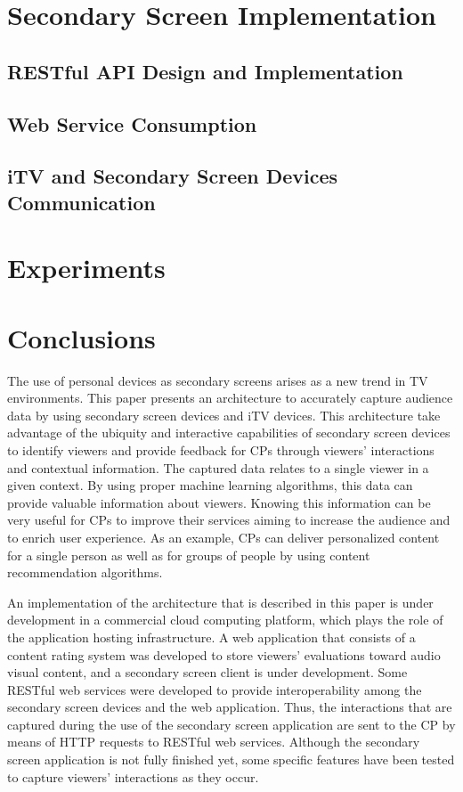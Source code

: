 \documentclass[journal]{IEEEtran}
\begin{document}
\section{Secondary Screen Implementation}

\subsection{RESTful API Design and Implementation}

\subsection{Web Service Consumption}

\subsection{iTV and Secondary Screen Devices Communication}

\section{Experiments}

\section{Conclusions}

The use of personal devices as secondary screens arises as a new trend in TV environments. This paper presents an architecture to accurately capture audience data by using secondary screen devices and iTV devices. This architecture take advantage of the ubiquity and interactive capabilities of secondary screen devices to identify viewers and provide feedback for CPs through viewers' interactions and contextual information. The captured data relates to a single viewer in a given context. By using proper machine learning algorithms, this data can provide valuable information about viewers. Knowing this information can be very useful for CPs to improve their services aiming to increase the audience and to enrich user experience. As an example, CPs can deliver personalized content for a single person as well as for groups of people by using content recommendation algorithms.

An implementation of the architecture that is described in this paper is under development in a commercial cloud computing platform, which plays the role of the application hosting infrastructure. A web application that consists of a content rating system was developed to store  viewers' evaluations toward audio visual content, and a secondary screen client is under development. Some RESTful web services were developed to provide interoperability among the secondary screen devices and the web application. Thus, the interactions that are captured during the use of the secondary screen application are sent to the CP by means of HTTP requests to RESTful web services. Although the secondary screen application is not fully finished yet, some specific features have been tested to capture viewers' interactions as they occur.
\end{document}
